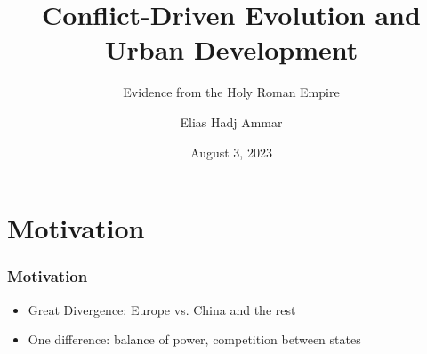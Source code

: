 \documentclass{beamer}
\title[Kolloquium]{Conflict-Driven Evolution and Urban Development} %
\subtitle{Evidence from the Holy Roman Empire}
\author{Elias Hadj Ammar} %
\institute[LMU] %
{
LMU Munich\\ %
\medskip
\textit{Elias.Ammar@campus.lmu.de} %
}
\date{August 3, 2023} %
\begin{document}
\begin{frame}
\titlepage %
\end{frame}






\section{Motivation} %

\begin{frame}
\frametitle{Motivation}

\begin{itemize}
    \item Great Divergence: Europe vs. China and the rest
    \item One difference: balance of power, competition between states
\end{itemize}

\end{frame}

\end{document}

